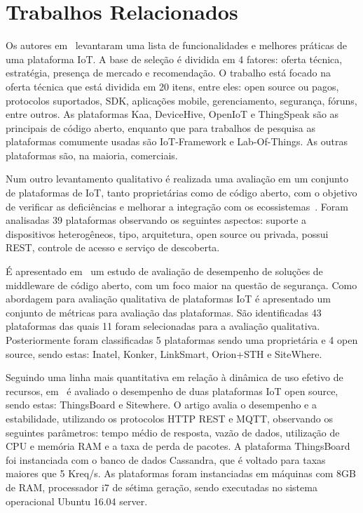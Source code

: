 \documentclass{sbrt}
\begin{document}
\section{Trabalhos Relacionados}
\label{sec:trabfut}

Os autores em~\cite{ganguly2016selecting} levantaram uma lista de funcionalidades e melhores práticas de uma plataforma IoT. A base de seleção é dividida em 4 fatores: oferta técnica, estratégia, presença de mercado e recomendação. O trabalho está focado na oferta técnica que está dividida em 20 itens, entre eles: open source ou pagos, protocolos suportados, SDK, aplicações mobile, gerenciamento, segurança, fóruns, entre outros. As plataformas Kaa, DeviceHive, OpenIoT e ThingSpeak são as principais de código aberto, enquanto que para trabalhos de pesquisa as plataformas comumente usadas são IoT-Framework e Lab-Of-Things. As outras plataformas são, na maioria, comerciais.

Num outro levantamento qualitativo é realizada uma avaliação em um conjunto de plataformas de IoT, tanto proprietárias como de código aberto, com o objetivo de verificar as deficiências e melhorar a integração com os ecossistemas~\cite{mineraud2016gap}. Foram analisadas 39 plataformas observando os seguintes aspectos: suporte a dispositivos heterogêneos, tipo, arquitetura, open source ou privada, possui REST, controle de acesso e serviço de descoberta. 

É apresentado em~\cite{da2018performance} um estudo de avaliação de desempenho de soluções de middleware de código aberto, com um foco maior na questão de segurança. Como abordagem para avaliação qualitativa de plataformas IoT é apresentado um conjunto de métricas para avaliação das plataformas. São identificadas 43 plataformas das quais 11 foram selecionadas para a avaliação qualitativa. Posteriormente foram classificadas 5 plataformas sendo uma proprietária e 4 open source, sendo estas: Inatel, Konker, LinkSmart, Orion+STH e SiteWhere. 

Seguindo uma linha mais quantitativa em relação à dinâmica de uso efetivo de recursos, em~\cite{ismail2018performance} é avaliado o desempenho de duas plataformas IoT open source, sendo estas: ThingsBoard e Sitewhere. O artigo avalia o desempenho e a estabilidade, utilizando os protocolos HTTP REST e MQTT, observando os seguintes parâmetros: tempo médio de resposta, vazão de dados, utilização de CPU e memória RAM e a taxa de perda de pacotes. A plataforma ThingsBoard foi instanciada com o banco de dados Cassandra, que é voltado para taxas maiores que 5 Kreq/s. As plataformas foram instanciadas em máquinas com 8GB de RAM, processador i7 de sétima geração, sendo executadas no sistema operacional Ubuntu 16.04 server.
\end{document}
